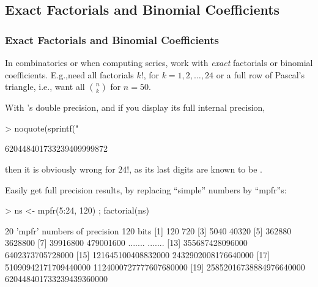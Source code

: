 


\subsection{Exact Factorials and Binomial Coefficients}
\begin{frame}[fragile]\frametitle{Exact Factorials and Binomial Coefficients}
In combinatorics or when computing series,
work with \emph{exact} factorials or binomial coefficients.
E.g.,need all factorials $k!$, for $k=1,2,\dots,24$ or a full row
of Pascal's triangle, i.e., want all $\binom{n}{k}$ for $n=50$.

With \Rp's double precision,
and if you display its full internal precision,
\begin{Schunk}
\begin{Sinput}
> noquote(sprintf("%-30.0f", factorial(24)))
\end{Sinput}
\begin{Soutput}
[1] 620448401733239409999872      
\end{Soutput}
\end{Schunk}
\smallskip
then it is obviously wrong for $24!$, as its last digits are known to be .

\medskip

Easily get full precision results, by
replacing ``simple'' numbers by ``mpfr''s:
\begin{Schunk}
\begin{Sinput}
> ns <- mpfr(5:24, 120) ; factorial(ns)
\end{Sinput}
\end{Schunk}
\begin{Schunk}
\begin{Soutput}
20 'mpfr' numbers of precision  120   bits 
 [1]                      120                      720
 [3]                     5040                    40320
 [5]                   362880                  3628800
 [7]                 39916800                479001600
 ....... 
 ....... 
[13]          355687428096000         6402373705728000
[15]       121645100408832000      2432902008176640000
[17]     51090942171709440000   1124000727777607680000
[19]  25852016738884976640000 620448401733239439360000
\end{Soutput}
\end{Schunk}
\end{frame}

